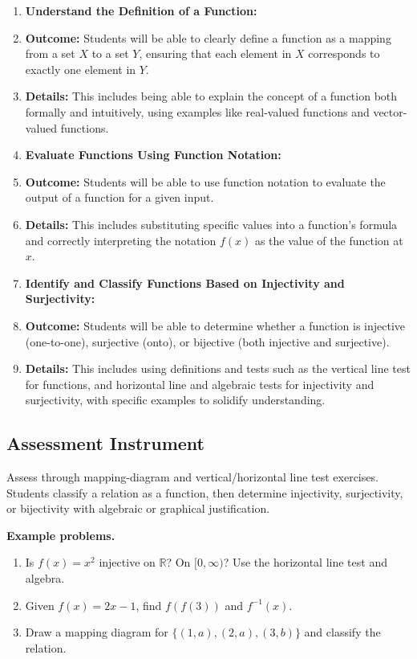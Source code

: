 \begin{enumerate}
    \item \textbf{Understand the Definition of a Function:}
    \item \textbf{Outcome:} Students will be able to clearly define a function as a mapping from a set $ X $ to a set $ Y $, ensuring that each element in $ X $ corresponds to exactly one element in $ Y $.
    \item \textbf{Details:} This includes being able to explain the concept of a function both formally and intuitively, using examples like real-valued functions and vector-valued functions.
    \item \textbf{Evaluate Functions Using Function Notation:}
    \item \textbf{Outcome:} Students will be able to use function notation to evaluate the output of a function for a given input.
    \item \textbf{Details:} This includes substituting specific values into a function's formula and correctly interpreting the notation $ f(x) $ as the value of the function at $ x $.
    \item \textbf{Identify and Classify Functions Based on Injectivity and Surjectivity:}
    \item \textbf{Outcome:} Students will be able to determine whether a function is injective (one-to-one), surjective (onto), or bijective (both injective and surjective).
    \item \textbf{Details:} This includes using definitions and tests such as the vertical line test for functions, and horizontal line and algebraic tests for injectivity and surjectivity, with specific examples to solidify understanding.
\end{enumerate}


\subsection{Assessment Instrument}
\label{ssec:asse-3669}


Assess through mapping-diagram and vertical/horizontal line test exercises.
Students classify a relation as a function, then determine injectivity,
surjectivity, or bijectivity with algebraic or graphical justification.

\textbf{Example problems.}
\begin{enumerate}
    \item Is $f(x) = x^2$ injective on $\mathbb{R}$? On $[0,\infty)$?
          Use the horizontal line test and algebra.
    \item Given $f(x) = 2x - 1$, find $f(f(3))$ and $f^{-1}(x)$.
    \item Draw a mapping diagram for $\{(1,a),(2,a),(3,b)\}$ and classify
          the relation.
\end{enumerate}



